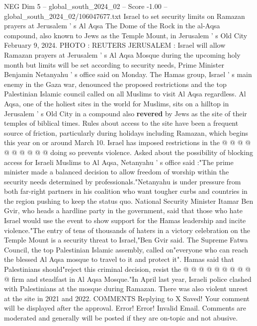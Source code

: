 \begin{textsample}{NEG Dim 5 – global\_south\_2024\_02 – Score -1.00 – global\_south\_2024\_02/106047677.txt}  \label{ex:f5_neg_301}
Israel to set security limits on Ramazan prayers at Jerusalem ' s Al Aqsa The Dome of the Rock in the al-Aqsa compound, also known to Jews as the Temple Mount, in Jerusalem ' s Old City February 9, 2024.
PHOTO : REUTERS JERUSALEM : Israel will allow Ramazan prayers at Jerusalem ' s Al Aqsa Mosque during the upcoming holy month but limits will be set according to security needs, Prime Minister Benjamin Netanyahu ' s office said on Monday.
The Hamas group, Israel ' s main enemy in the Gaza war, denounced the proposed restrictions and the top Palestinian Islamic council called on all Muslims to visit Al Aqsa regardless.
Al Aqsa, one of the holiest sites in the world for Muslims, sits on a hilltop in Jerusalem ' s Old City in a compound also \textbf{revered} by Jews as the site of their temples of biblical times.
Rules about access to the site have been a frequent source of friction, particularly during holidays including Ramazan, which begins this year on or around March 10.
Israel has imposed restrictions in the @ @ @ @ @ @ @ @ @ @ doing so prevents violence.
Asked about the possibility of blocking access for Israeli Muslims to Al Aqsa, Netanyahu ' s office said :"The prime minister made a balanced decision to allow freedom of worship within the security needs determined by professionals."Netanyahu is under pressure from both far-right partners in his coalition who want tougher curbs and countries in the region pushing to keep the status quo.
National Security Minister Itamar Ben Gvir, who heads a hardline party in the government, said that those who hate Israel would use the event to show support for the Hamas leadership and incite violence."The entry of tens of thousands of haters in a victory celebration on the Temple Mount is a security threat to Israel,"Ben Gvir said.
The Supreme Fatwa Council, the top Palestinian Islamic assembly, called on"everyone who can reach the blessed Al Aqsa mosque to travel to it and protect it".
Hamas said that Palestinians should"reject this criminal decision, resist the @ @ @ @ @ @ @ @ @ @ firm and steadfast in Al Aqsa Mosque."In April last year, Israeli police clashed with Palestinians at the mosque during Ramazan.
There was also violent unrest at the site in 2021 and 2022.
COMMENTS Replying to X Saved!
Your comment will be displayed after the approval.
Error!
Error!
Invalid Email.
Comments are moderated and generally will be posted if they are on-topic and not abusive.

\end{textsample}
